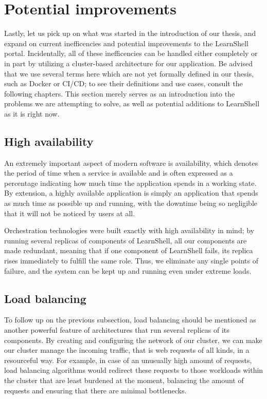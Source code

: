 \documentclass[thesis=B,english]{FITthesis}[2019/12/23]
\begin{document}
\section{Potential improvements}

Lastly, let us pick up on what was started in the introduction of our thesis, and expand on current inefficencies and potential improvements to the LearnShell portal. Incidentally, all of these inefficencies can be handled either completely or in part by utilizing a cluster-based architecture for our application. Be advised that we use several terms here which are not yet formally defined in our thesis, such as Docker or CI/CD; to see their definitions and use cases, consult the following chapters. This section merely serves as an introduction into the problems we are attempting to solve, as well as potential additions to LearnShell as it is right now.

\subsection{High availability}

An extremely important aspect of modern software is availability, which denotes the period of time when a service is available and is often expressed as a percentage indicating how much time the application spends in a working state. \cite{what-is-high-availability} By extension, a highly available application is simply an application that spends as much time as possible up and running, with the downtime being so negligible that it will not be noticed by users at all.

Orchestration technologies were built exactly with high availability in mind; by running several replicas of components of LearnShell, all our components are made redundant, meaning that if one component of LearnShell fails, its replica rises immediately to fulfill the same role. Thus, we eliminate any single points of failure, and the system can be kept up and running even under extreme loads.

\subsection{Load balancing}

To follow up on the previous subsection, load balancing should be mentioned as another powerful feature of architectures that run several replicas of its components. By creating and configuring the network of our cluster, we can make our cluster manage the incoming traffic, that is web requests of all kinds, in a resourceful way. For example, in case of an unusually high amount of requests, load balancing algorithms would redirect these requests to those workloads within the cluster that are least burdened at the moment, balancing the amount of requests and ensuring that there are minimal bottlenecks.
\end{document}
